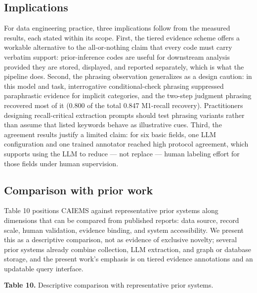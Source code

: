 \documentclass[11pt]{article}
\begin{document}
\subsection{Implications}
For data engineering practice, three implications follow from the measured results, each stated within its scope. First, the tiered evidence scheme offers a workable alternative to the all-or-nothing claim that every code must carry verbatim support: prior-inference codes are useful for downstream analysis provided they are stored, displayed, and reported separately, which is what the pipeline does. Second, the phrasing observation generalizes as a design caution: in this model and task, interrogative conditional-check phrasing suppressed paraphrastic evidence for implicit categories, and the two-step judgment phrasing recovered most of it (0.800 of the total 0.847 M1-recall recovery). Practitioners designing recall-critical extraction prompts should test phrasing variants rather than assume that listed keywords behave as illustrative cues. Third, the agreement results justify a limited claim: for six basic fields, one LLM configuration and one trained annotator reached high protocol agreement, which supports using the LLM to reduce --- not replace --- human labeling effort for those fields under human supervision.

\subsection{Comparison with prior work}
Table 10 positions CAIEMS against representative prior systems along dimensions that can be compared from published reports: data source, record scale, human validation, evidence binding, and system accessibility. We present this as a descriptive comparison, not as evidence of exclusive novelty; several prior systems already combine collection, LLM extraction, and graph or database storage, and the present work's emphasis is on tiered evidence annotations and an updatable query interface.

\textbf{Table 10.} Descriptive comparison with representative prior systems.
\end{document}
